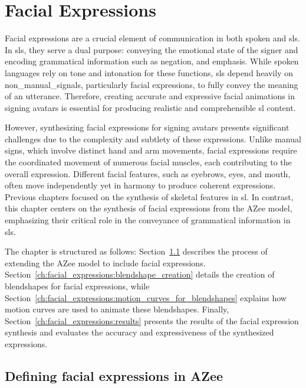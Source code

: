 \documentclass[../../main]{subfiles}
\begin{document}
\chapter{Facial Expressions}
\label{ch:facial_expressions}

Facial expressions are a crucial element of communication in both spoken and \gls{sl}s. In \gls{sl}s, they serve a dual purpose: conveying the emotional state of the signer and encoding grammatical information such as negation, and emphasis. While spoken languages rely on tone and intonation for these functions, \gls{sl}s depend heavily on \gls{non_manual_signals}, particularly facial expressions, to fully convey the meaning of an utterance. Therefore, creating accurate and expressive facial animations in signing avatars is essential for producing realistic and comprehensible \gls{sl} content.

However, synthesizing facial expressions for signing avatars presents significant challenges due to the complexity and subtlety of these expressions. Unlike manual signs, which involve distinct hand and arm movements, facial expressions require the coordinated movement of numerous facial muscles, each contributing to the overall expression. Different facial features, such as eyebrows, eyes, and mouth, often move independently yet in harmony to produce coherent expressions. Previous chapters focused on the synthesis of skeletal features in \gls{sl}. In contrast, this chapter centers on the synthesis of facial expressions from the AZee model, emphasizing their critical role in the conveyance of grammatical information in \gls{sl}s.

The chapter is structured as follows: Section~\ref{ch:facial_expressions:adding_facial_expressions_to_azee} describes the process of extending the AZee model to include facial expressions. Section~\ref{ch:facial_expressions:blendshape_creation} details the creation of blendshapes for facial expressions, while Section~\ref{ch:facial_expressions:motion_curves_for_blendshapes} explains how motion curves are used to animate these blendshapes. Finally, Section~\ref{ch:facial_expressions:results} presents the results of the facial expression synthesis and evaluates the accuracy and expressiveness of the synthesized expressions.

\section{Defining facial expressions in AZee}
\label{ch:facial_expressions:adding_facial_expressions_to_azee}
\end{document}
